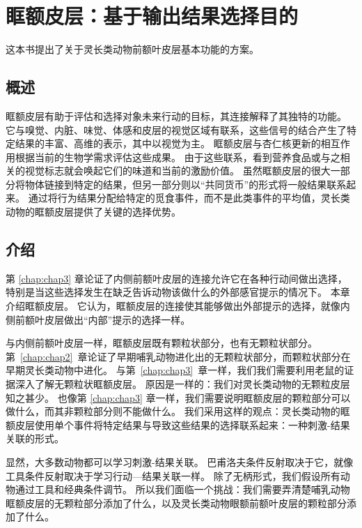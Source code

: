 \chapter{眶额皮层：基于输出结果选择目的}\label{chap:chap4}

这本书提出了关于灵长类动物前额叶皮层基本功能的方案。



\section{概述}

眶额皮层有助于评估和选择对象未来行动的目标，其连接解释了其独特的功能。 
它与嗅觉、内脏、味觉、体感和皮层的视觉区域有联系，这些信号的结合产生了特定结果的丰富、高维的表示，其中以视觉为主。
眶额皮层与杏仁核更新的相互作用根据当前的生物学需求评估这些成果。
由于这些联系，看到营养食品或与之相关的视觉标志就会唤起它们的味道和当前的激励价值。
虽然眶额皮层的很大一部分将物体链接到特定的结果，但另一部分则以“共同货币”的形式将一般结果联系起来。
通过将行为结果分配给特定的觅食事件，而不是此类事件的平均值，灵长类动物的眶额皮层提供了关键的选择优势。



\section{介绍}

第 \ref{chap:chap3} 章论证了内侧前额叶皮层的连接允许它在各种行动间做出选择，特别是当这些选择发生在缺乏告诉动物该做什么的外部感官提示的情况下。
本章介绍眶额皮层。
它认为，眶额皮层的连接使其能够做出外部提示的选择，就像内侧前额叶皮层做出“内部”提示的选择一样。


与内侧前额叶皮层一样，眶额皮层既有颗粒状部分，也有无颗粒状部分。
第~\ref{chap:chap2}~章论证了早期哺乳动物进化出的无颗粒状部分，而颗粒状部分在早期灵长类动物中进化。
与第~\ref{chap:chap3}~章一样，我们我们需要利用老鼠的证据深入了解无颗粒状眶额皮层。
原因是一样的：我们对灵长类动物的无颗粒皮层知之甚少。
也像第 \ref{chap:chap3} 章一样，我们需要说明眶额皮层的颗粒部分可以做什么，而其非颗粒部分则不能做什么。
我们采用这样的观点：灵长类动物的眶额皮层使用单个事件将特定结果与导致这些结果的选择联系起来：一种刺激-结果关联的形式。\par


显然，大多数动物都可以学习刺激-结果关联。
巴甫洛夫条件反射取决于它，就像工具条件反射取决于学习行动—结果关联一样。
除了无柄形式，我们假设所有动物通过工具和经典条件调节。
所以我们面临一个挑战：我们需要弄清楚哺乳动物眶额皮层的无颗粒部分添加了什么，以及灵长类动物眼额前额叶皮层的颗粒部分添加了什么。


